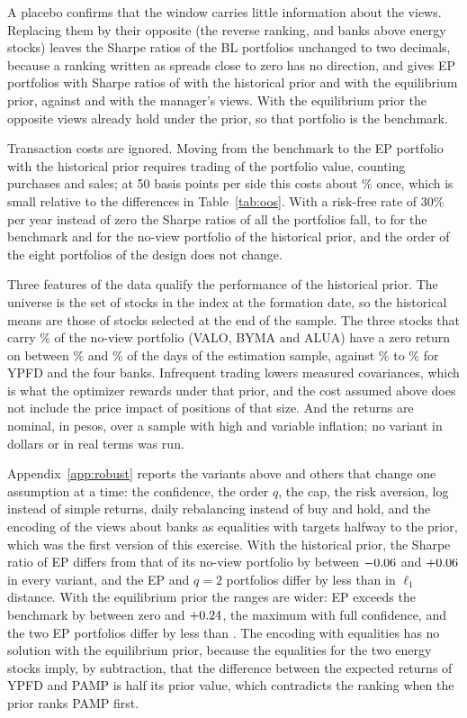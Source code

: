 \documentclass[11pt]{article}
\begin{document}
A placebo confirms that the window carries little information about the
views. Replacing them by their opposite (the reverse ranking, and banks
above energy stocks) leaves the Sharpe ratios of the BL portfolios unchanged to two decimals,
because a ranking written as spreads close to zero has no direction, and
gives EP portfolios with Sharpe ratios of \nShPlaceboEP{} with the
historical prior and \nShPlaceboEPeq{} with the equilibrium prior, against
\nShEP{} and \nShEPeq{} with the manager's views. With the equilibrium
prior the opposite views already hold under the prior, so that portfolio is
the benchmark.

Transaction costs are ignored. Moving from the benchmark to the EP
portfolio with the historical prior requires trading \nTurnEP{} of the
portfolio value, counting purchases and sales; at 50 basis points per side
this costs about \nCostEP\% once, which is small relative to the
differences in Table~\ref{tab:oos}. With a risk-free rate of 30\% per year
instead of zero the Sharpe ratios of all the portfolios fall, to
\nShBenchRf{} for the benchmark and \nShMVhistRf{} for the no-view
portfolio of the historical prior, and the order of the eight portfolios
of the design does not change.

Three features of the data qualify the performance of the historical
prior. The universe is the set of stocks in the index at the formation
date, so the historical means are those of stocks selected at the end of
the sample. The three stocks that carry \nWIlliq\% of the no-view portfolio
(VALO, BYMA and ALUA) have a zero return on between \nZeroIlliqMin\% and
\nZeroIlliqMax\% of the days of the estimation sample, against
\nZeroLiqMin\% to \nZeroLiqMax\% for YPFD and the four banks. Infrequent
trading lowers measured covariances, which is what the optimizer rewards
under that prior, and the cost assumed above does not include the price
impact of positions of that size. And the returns are nominal, in pesos,
over a sample with high and variable inflation; no variant in dollars or
in real terms was run.

Appendix~\ref{app:robust} reports the variants above and others that change
one assumption at a time: the confidence, the order $q$, the cap, the risk
aversion, log instead of simple returns, daily rebalancing instead of buy
and hold, and the encoding of the views about banks as equalities with
targets halfway to the prior, which was the first version of this
exercise. With the historical prior, the Sharpe ratio of EP differs from that of
its no-view portfolio by between $-0.06$ and $+0.06$ in every
variant, and the EP and $q=2$ portfolios differ by less than \nRobQmax{}
in $\ell_1$ distance. With the equilibrium prior the ranges are wider: EP
exceeds the benchmark by between zero and $+0.24$, the maximum with
full confidence, and the two EP portfolios differ by less than
\nRobQmaxEq. The
encoding with equalities has no solution with the equilibrium prior,
because the equalities for the two energy stocks imply, by subtraction,
that the difference between the expected returns of YPFD and PAMP is half
its prior value, which contradicts the ranking when the prior
ranks PAMP first.
\end{document}
